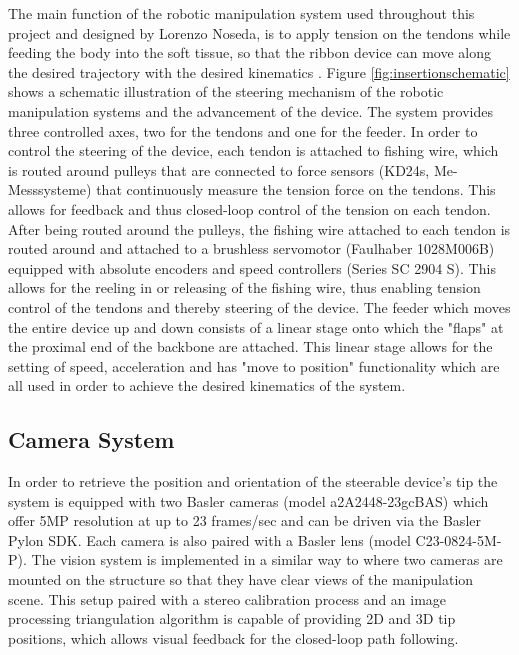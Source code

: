 The main function of the robotic manipulation system used throughout this project and designed by Lorenzo Noseda, is to apply tension on the tendons while feeding the body into the soft tissue, so that the ribbon device can move along the desired trajectory with the desired kinematics \cite{noseda_flat_2024}. 
\newline \newline
Figure \ref{fig:insertionschematic} shows a schematic illustration of the steering mechanism of the robotic manipulation systems and the advancement of the device. The system provides three controlled axes, two for the tendons and one for the feeder. 
\newline \newline 
In order to control the steering of the device, each tendon is attached to fishing wire, which is routed around pulleys that are connected to force sensors (KD24s, Me-Messsysteme) that continuously measure the tension force on the tendons. This allows for feedback and thus closed-loop control of the tension on each tendon. After being routed around the pulleys, the fishing wire attached to each tendon is routed around and attached to a brushless servomotor (Faulhaber 1028M006B) equipped with absolute encoders and speed controllers (Series SC 2904 S). This allows for the reeling in or releasing of the fishing wire, thus enabling tension control of the tendons and thereby steering of the device. 
\newline \newline
The feeder which moves the entire device up and down consists of a linear stage  onto which the "flaps" at the proximal end of the backbone are attached. This linear stage allows for the setting of speed, acceleration and has "move to position" functionality which are all used in order to achieve the desired kinematics of the system.


\subsection{Camera System}
In order to retrieve the position and orientation of the steerable device's tip the system is equipped with two Basler cameras (model a2A2448-23gcBAS) which offer 5MP resolution at up to 23 frames/sec and can be driven via the Basler Pylon SDK. Each camera is also paired with a Basler lens (model C23-0824-5M-P). The vision system is implemented in a similar way to \cite{dalvand_high_2016} where two cameras are mounted on the structure so that they have clear views of the manipulation scene. This setup paired with a stereo calibration process and an image processing triangulation algorithm is capable of providing 2D and 3D tip positions, which allows visual feedback for the closed-loop path following.

